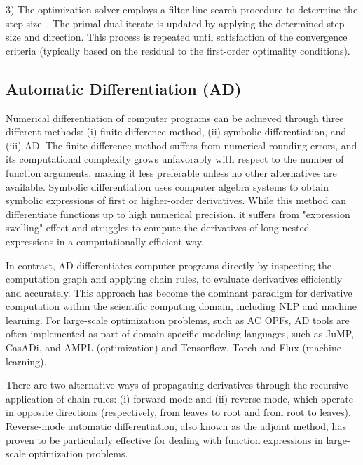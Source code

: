 3) The optimization solver employs a filter line search procedure to
determine the step size~\cite{wachter2006implementation}. The primal-dual iterate is updated by
applying the determined step size and direction. This process is
repeated until satisfaction of the convergence criteria (typically based on the residual
to the first-order optimality conditions).

\subsection{Automatic Differentiation (AD)}
Numerical differentiation of computer programs can be achieved through
three different methods: (i) finite difference method, (ii) symbolic
differentiation, and (iii) AD. The finite difference method suffers
from numerical rounding errors, and its computational complexity grows
unfavorably with respect to the number of function arguments, making
it less preferable unless no other alternatives are
available. Symbolic differentiation uses computer algebra systems to
obtain symbolic expressions of first or higher-order
derivatives. While this method can differentiate functions up to high
numerical precision, it suffers from "expression swelling" effect and
struggles to compute the derivatives of long nested expressions in a
computationally efficient way.

In contrast, AD differentiates computer
programs directly by inspecting the computation graph and applying chain rules,
to evaluate derivatives efficiently and accurately.
This approach has become the dominant paradigm for derivative computation within the
scientific computing domain, including NLP and
machine learning. For large-scale optimization problems, such as AC OPFs, AD
tools are often implemented as part of domain-specific modeling
languages, such as JuMP, CasADi, and AMPL (optimization) and Tensorflow, Torch and
Flux (machine learning).

There are two alternative ways of propagating derivatives through the
recursive application of chain rules: (i) forward-mode and (ii)
reverse-mode, which operate in opposite directions (respectively, from leaves to
root and from root to leaves). Reverse-mode automatic
differentiation, also known as the adjoint method, has proven to be
particularly effective for dealing with function expressions in
large-scale optimization problems.

